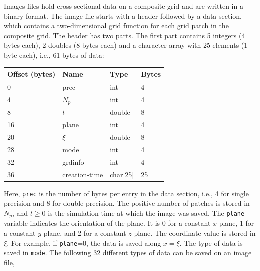 \documentclass[11pt]{report}
\begin{document}
Images files hold cross-sectional data on a composite grid and are written in a binary format. The
image file starts with a header followed by a data section, which contains a two-dimensional grid
function for each grid patch in the composite grid. The header has two parts. The first part
contains 5 integers (4 bytes each), 2 doubles (8 bytes each) and a character array with 25 elements
(1 byte each), i.e., 61 bytes of data:
\begin{center}
\begin{tabular}{llll}\hline
Offset (bytes) & Name & Type & Bytes \\ \hline
0 & prec   & int & 4 \\ \hline
4 & $N_p$  & int & 4 \\ \hline
8 & $t$    & double & 8 \\ \hline
16 & plane & int & 4 \\ \hline
20 & $\xi$ & double & 8 \\ \hline
28 & mode  & int & 4 \\ \hline
32 & grdinfo & int & 4 \\ \hline
36 & creation-time & char[25] & 25 \\ \hline
\end{tabular}
\end{center}
Here, {\tt prec} is the number of bytes per entry in the data section, i.e., 4 for single precision
and 8 for double precision. The positive number of patches is stored in $N_p$, and $t\geq 0$ is the
simulation time at which the image was saved. The {\tt plane} variable indicates the orientation of
the plane. It is 0 for a constant $x$-plane, 1 for a constant $y$-plane, and 2 for a constant
$z$-plane. The coordinate value is stored in $\xi$. For example, if {\tt plane}=0, the data is saved
along $x=\xi$. The type of data is saved in {\tt mode}. The following 32 different types of data can
be saved on an image file,
\end{document}

